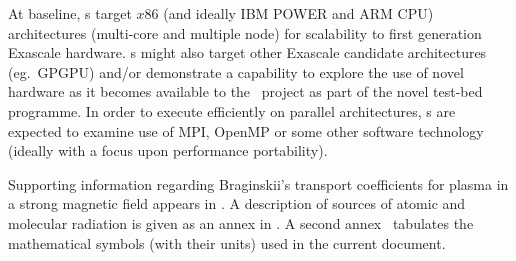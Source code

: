 At baseline, \papp s target $x86$ (and ideally IBM POWER and ARM 
CPU) architectures (multi-core and multiple node) for scalability to first 
generation Exascale hardware. \Papp s might also target other 
Exascale candidate architectures (eg.\ GPGPU) and/or demonstrate a capability to 
explore the use of novel hardware as it becomes available to the \exc \   
project as part of the novel test-bed programme. In order to execute
efficiently on parallel architectures, \papp s are expected to examine
use of MPI, OpenMP or some other software technology
(ideally with a focus upon performance portability).


Supporting information regarding Braginskii's transport
coefficients for plasma in a strong magnetic field appears in .
A description of sources of atomic and molecular radiation is given as an
annex in \Sec{atomic}. A second annex~\Sec{mathsymb}  tabulates the mathematical
symbols (with their units) used in the current document.
